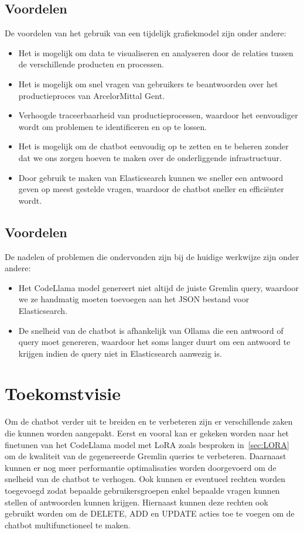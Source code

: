 \subsection{Voordelen}
De voordelen van het gebruik van een tijdelijk grafiekmodel zijn onder andere:
\begin{itemize}
    \item Het is mogelijk om data te visualiseren en analyseren door de relaties tussen de verschillende producten en processen.
    \item Het is mogelijk om snel vragen van gebruikers te beantwoorden over het productieproces van ArcelorMittal Gent.
    \item Verhoogde traceerbaarheid van productieprocessen, waardoor het eenvoudiger wordt om problemen te identificeren en op te lossen.
    \item Het is mogelijk om de chatbot eenvoudig op te zetten en te beheren zonder dat we ons zorgen hoeven te maken over de onderliggende infrastructuur.
    \item Door gebruik te maken van Elasticsearch kunnen we sneller een antwoord geven op meest gestelde vragen, waardoor de chatbot sneller en efficiënter wordt.
\end{itemize}

\subsection{Voordelen}
De nadelen of problemen die ondervonden zijn bij de huidige werkwijze zijn onder andere:
\begin{itemize}
    \item Het CodeLlama model genereert niet altijd de juiste Gremlin query, waardoor we ze handmatig moeten toevoegen aan het JSON bestand voor Elasticsearch.
    \item De snelheid van de chatbot is afhankelijk van Ollama die een antwoord of query moet genereren, waardoor het soms langer duurt om een antwoord te krijgen indien de query niet in Elasticsearch aanwezig is.
\end{itemize}

\section{Toekomstvisie}
Om de chatbot verder uit te breiden en te verbeteren zijn er verschillende zaken die kunnen worden aangepakt.
Eerst en vooral kan er gekeken worden naar het finetunen van het CodeLlama model met LoRA zoals besproken in~\ref{sec:LORA} om de kwaliteit van de gegenereerde Gremlin queries te verbeteren.
Daarnaast kunnen er nog meer performantie optimalisaties worden doorgevoerd om de snelheid van de chatbot te verhogen.
Ook kunnen er eventueel rechten worden toegevoegd zodat bepaalde gebruikersgroepen enkel bepaalde vragen kunnen stellen of antwoorden kunnen krijgen.
Hiernaast kunnen deze rechten ook gebruikt worden om de DELETE, ADD en UPDATE acties toe te voegen om de chatbot multifunctioneel te maken.


